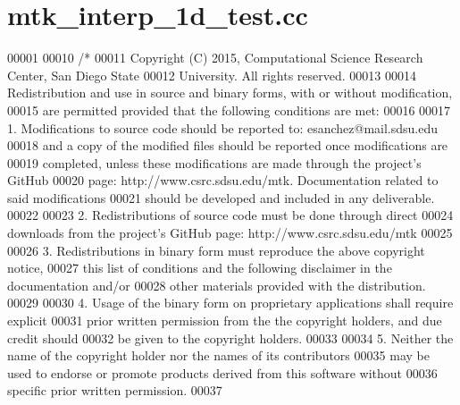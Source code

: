 \hypertarget{mtk__interp__1d__test_8cc_source}{\section{mtk\+\_\+interp\+\_\+1d\+\_\+test.\+cc}
\label{mtk__interp__1d__test_8cc_source}
}

\begin{DoxyCode}
00001 
00010 \textcolor{comment}{/*}
00011 \textcolor{comment}{Copyright (C) 2015, Computational Science Research Center, San Diego State}
00012 \textcolor{comment}{University. All rights reserved.}
00013 \textcolor{comment}{}
00014 \textcolor{comment}{Redistribution and use in source and binary forms, with or without modification,}
00015 \textcolor{comment}{are permitted provided that the following conditions are met:}
00016 \textcolor{comment}{}
00017 \textcolor{comment}{1. Modifications to source code should be reported to: esanchez@mail.sdsu.edu}
00018 \textcolor{comment}{and a copy of the modified files should be reported once modifications are}
00019 \textcolor{comment}{completed, unless these modifications are made through the project's GitHub}
00020 \textcolor{comment}{page: http://www.csrc.sdsu.edu/mtk. Documentation related to said modifications}
00021 \textcolor{comment}{should be developed and included in any deliverable.}
00022 \textcolor{comment}{}
00023 \textcolor{comment}{2. Redistributions of source code must be done through direct}
00024 \textcolor{comment}{downloads from the project's GitHub page: http://www.csrc.sdsu.edu/mtk}
00025 \textcolor{comment}{}
00026 \textcolor{comment}{3. Redistributions in binary form must reproduce the above copyright notice,}
00027 \textcolor{comment}{this list of conditions and the following disclaimer in the documentation and/or}
00028 \textcolor{comment}{other materials provided with the distribution.}
00029 \textcolor{comment}{}
00030 \textcolor{comment}{4. Usage of the binary form on proprietary applications shall require explicit}
00031 \textcolor{comment}{prior written permission from the the copyright holders, and due credit should}
00032 \textcolor{comment}{be given to the copyright holders.}
00033 \textcolor{comment}{}
00034 \textcolor{comment}{5. Neither the name of the copyright holder nor the names of its contributors}
00035 \textcolor{comment}{may be used to endorse or promote products derived from this software without}
00036 \textcolor{comment}{specific prior written permission.}
00037 \textcolor{comment}{}

\end{DoxyCode}
